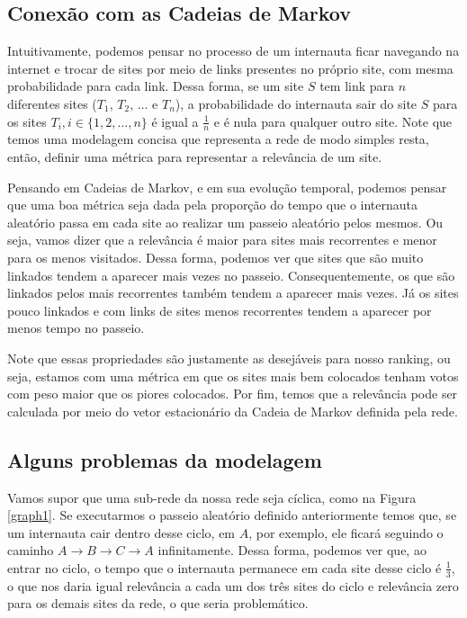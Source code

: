 \documentclass{article}
\begin{document}

\subsection*{Conexão com as Cadeias de Markov}

Intuitivamente, podemos pensar no processo de um internauta ficar navegando na internet e trocar de sites por meio de links presentes no próprio site, com mesma probabilidade para cada link. Dessa forma, se um site $S$ tem link para $n$ diferentes sites ($T_1$, $T_2$, $\dots$ e $T_n$), a probabilidade do internauta sair do site $S$ para os sites $T_i, i \in \{1, 2, \dots, n\}$ é igual a $\frac{1}{n}$ e é nula para qualquer outro site. Note que temos uma modelagem concisa que representa a rede de modo simples resta, então, definir uma métrica para representar a relevância de um site.

Pensando em Cadeias de Markov, e em sua evolução temporal, podemos pensar que uma boa métrica seja dada pela proporção do tempo que o internauta aleatório passa em cada site ao realizar um passeio aleatório pelos mesmos. Ou seja, vamos dizer que a relevância é maior para sites mais recorrentes e menor para os menos visitados. Dessa forma, podemos ver que sites que são muito linkados tendem a aparecer mais vezes no passeio. Consequentemente, os que são linkados pelos mais recorrentes também tendem a aparecer mais vezes. Já os sites pouco linkados e com links de sites menos recorrentes tendem a aparecer por menos tempo no passeio.

Note que essas propriedades são justamente as desejáveis para nosso ranking, ou seja, estamos com uma métrica em que os sites mais bem colocados tenham votos com peso maior que os piores colocados. Por fim, temos que a relevância pode ser calculada por meio do vetor estacionário da Cadeia de Markov definida pela rede.

\subsection*{Alguns problemas da modelagem}

Vamos supor que uma sub-rede da nossa rede seja cíclica, como na Figura \ref{graph1}. Se executarmos o passeio aleatório definido anteriormente temos que, se um internauta cair dentro desse ciclo, em $A$, por exemplo, ele ficará seguindo o caminho $A\to B\to C\to A$ infinitamente. Dessa forma, podemos ver que, ao entrar no ciclo, o tempo que o internauta permanece em cada site desse ciclo é $\frac{1}{3}$, o que nos daria igual relevância a cada um dos três sites do ciclo e relevância zero para os demais sites da rede, o que seria problemático.
\end{document}
